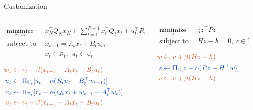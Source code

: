 \documentclass[aspectratio=169]{beamer}
\newcommand{\rtx}[1]{{\color{redorange}#1}}
\newcommand{\btx}[1]{{\color{royalblue}#1}}
\begin{document}
\begin{frame}{Customization}

    \vspace{-1cm}

    \begin{columns}[T]
        \begin{column}{0.6\textwidth}
            \begin{equation*}
                \begin{aligned}
        \underset{x_t,u_t}{\operatorname{minimize}}~~~&~x_N^\top Q_N x_N+\sum_{t=1}^{N-1} x_t^\top Q_t x_t + u_t^\top R_t u_t\\
        \operatorname{subject~to}~&~x_{t+1} = A_t x_t + B_tu_t, \\
        &~x_t\in\mathbb{X}_t,~~u_t \in \mathbb{U}_t
                \end{aligned}
                \end{equation*}  
                
                \vspace{1cm}

            $\begin{aligned}
                \rtx{w_t \gets {}} & \rtx{v_t+\beta (x_{t+1}-A_tx_{t}-B_tu_{t})} \\
                \btx{u_{t} \gets {}} & \btx{\Pi_{\mathbb{U}_t} [u_{t}-\alpha(R_tu_{t}-B_t^\top w_{t-1})]}\\
                \btx{x_t \gets {}} & \btx{\Pi_{\mathbb{X}_t}[x_t-\alpha(Q_tx_t+ w_{t-1}-A_t^\top w_{t})]}\\
                \rtx{v_t \gets {}} & \rtx{v_t +\beta (x_{t+1}-A_tx_{t}-B_tu_{t})}
            \end{aligned}$        
        \end{column}
        \begin{column}{0.4\textwidth}
            \begin{equation*}
                \begin{aligned}
            \underset{z}{\operatorname{minimize}}~~~&~\frac{1}{2}z^\top P z \\
            \operatorname{subject~to}~&~Hz-h=0,~ z\in\mathbb{D}
                \end{aligned}
                \end{equation*}
                
                \vspace{2cm}

            $\begin{aligned}
                \rtx{w \gets {}}   & \rtx{v + \beta(Hz-h)}\\
                \btx{z \gets {}}   & \btx{\Pi_{\mathbb{D}}[z - \alpha (Pz + H^\top w)]}\\
                \rtx{v \gets {}}   & \rtx{v + \beta(Hz-h)}            
            \end{aligned}$
    \end{column}
    \end{columns}
\end{frame}
\end{document}
